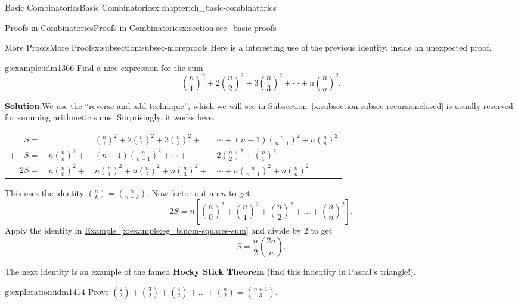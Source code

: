 \documentclass[oneside,10pt,]{book}
\newcommand{\terminology}[1]{\textbf{#1}}
\numberwithin{equation}{chapter}
\newcommand{\hrulethin}  {\noalign{\hrule height 0.04em}}
\begin{document}
\begin{chapterptx}{Basic Combinatorics}{}{Basic Combinatorics}{}{}{x:chapter:ch_basic-combinatorics}
\begin{sectionptx}{Proofs in Combinatorics}{}{Proofs in Combinatorics}{}{}{x:section:sec_basic-proofs}
\begin{subsectionptx}{More Proofs}{}{More Proofs}{}{}{x:subsection:subsec-moreproofs}
Here is a interesting use of the previous identity, inside an unexpected proof.%
\begin{example}{}{g:example:idm1366}%
Find a nice expression for the sum%
\begin{equation*}
\binom{n}{1}^2 + 2 \binom{n}{2}^2 + 3 \binom{n}{3}^2 + \cdots + n\binom{n}{n}^2\text{.}
\end{equation*}
%
\par\smallskip%
\noindent\textbf{Solution}.\hypertarget{g:solution:idm1370}{}\quad{}We use the ``reverse and add technique'', which we will see in \hyperref[x:subsection:subsec-recursionclosed]{Subsection~\ref{x:subsection:subsec-recursionclosed}} is usually reserved for summing arithmetic sums.  Surprisingly, it works here.%
\begin{sidebyside}{1}{0}{0}{0}%
\begin{sbspanel}{1}%
{\centering%
\begin{tabular}{rlll}
\(S  =\)&&\(\binom{n}{1}^2+2\binom{n}{2}^2+3\binom{n}{3}^2 + \)&\(\cdots +(n-1)\binom{n}{n-1}^2+n\binom{n}{n}^2\)\tabularnewline[0pt]
\(+ \quad S  =\)&\(n\binom{n}{n}^2 + \)&\((n-1)\binom{n}{n-1}^2+ \cdots +\)&\(2\binom{n}{2}^2+\binom{n}{1}^2\)\tabularnewline\hrulethin
\(2S  =\)&\(n\binom{n}{0}^2 + \)&\(n\binom{n}{1}^2 + n\binom{n}{2}^2+ n\binom{n}{3}^2 + \)&\(\cdots + n\binom{n}{n-1}^2+n\binom{n}{n}^2\)
\end{tabular}
\par}
\end{sbspanel}%
\end{sidebyside}%
\par
This uses the identity \(\binom{n}{k} = \binom{n}{n-k}\).  Now factor out an \(n\) to get%
\begin{equation*}
2S = n\left[\binom{n}{0}^{2} + \binom{n}{1}^{2} + \binom{n}{2}^{2} + \ldots + \binom{n}{n}^{2}\right]\text{.}
\end{equation*}
Apply the identity in \hyperref[x:example:eg_binom-squares-sum]{Example~\ref{x:example:eg_binom-squares-sum}} and divide by 2 to get%
\begin{equation*}
S = \frac{n}{2}\binom{2n}{n}\text{.}
\end{equation*}
%
\end{example}
The next identity is an example of the famed \terminology{Hocky Stick Theorem} (find this indentity in Pascal's triangle!).%
\begin{exploration}{}{g:exploration:idm1414}%
Prove \(\binom{2}{2} + \binom{3}{2} + \binom{4}{2} + \ldots + \binom{n}{2} = \binom{n + 1}{3}\).%

\end{exploration}
\end{subsectionptx}
\end{sectionptx}
\end{chapterptx}
\end{document}
